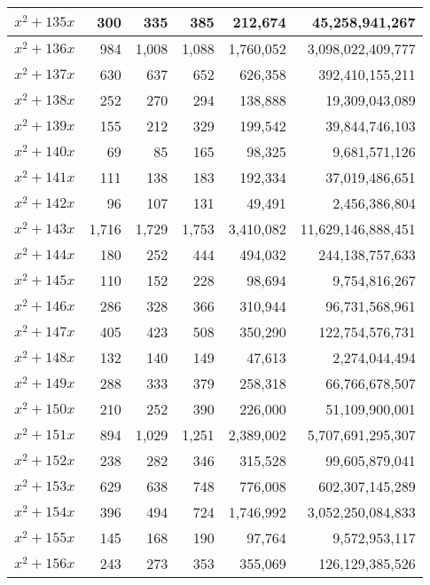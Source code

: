 \documentclass[a4paper]{amsproc}
\theoremstyle{plain}
\begin{document}
\begin{longtable}{ | l | r | r | r | r | r | }
$x^2 + 135x$ & 300 & 335 & 385 & 212{,}674 & 45{,}258{,}941{,}267 \\ \hline
$x^2 + 136x$ & 984 & 1{,}008 & 1{,}088 & 1{,}760{,}052 & 3{,}098{,}022{,}409{,}777 \\ \hline
$x^2 + 137x$ & 630 & 637 & 652 & 626{,}358 & 392{,}410{,}155{,}211 \\ \hline
$x^2 + 138x$ & 252 & 270 & 294 & 138{,}888 & 19{,}309{,}043{,}089 \\ \hline
$x^2 + 139x$ & 155 & 212 & 329 & 199{,}542 & 39{,}844{,}746{,}103 \\ \hline
$x^2 + 140x$ & 69 & 85 & 165 & 98{,}325 & 9{,}681{,}571{,}126 \\ \hline
$x^2 + 141x$ & 111 & 138 & 183 & 192{,}334 & 37{,}019{,}486{,}651 \\ \hline
$x^2 + 142x$ & 96 & 107 & 131 & 49{,}491 & 2{,}456{,}386{,}804 \\ \hline
$x^2 + 143x$ & 1{,}716 & 1{,}729 & 1{,}753 & 3{,}410{,}082 & 11{,}629{,}146{,}888{,}451 \\ \hline
$x^2 + 144x$ & 180 & 252 & 444 & 494{,}032 & 244{,}138{,}757{,}633 \\ \hline
$x^2 + 145x$ & 110 & 152 & 228 & 98{,}694 & 9{,}754{,}816{,}267 \\ \hline
$x^2 + 146x$ & 286 & 328 & 366 & 310{,}944 & 96{,}731{,}568{,}961 \\ \hline
$x^2 + 147x$ & 405 & 423 & 508 & 350{,}290 & 122{,}754{,}576{,}731 \\ \hline
$x^2 + 148x$ & 132 & 140 & 149 & 47{,}613 & 2{,}274{,}044{,}494 \\ \hline
$x^2 + 149x$ & 288 & 333 & 379 & 258{,}318 & 66{,}766{,}678{,}507 \\ \hline
$x^2 + 150x$ & 210 & 252 & 390 & 226{,}000 & 51{,}109{,}900{,}001 \\ \hline
$x^2 + 151x$ & 894 & 1{,}029 & 1{,}251 & 2{,}389{,}002 & 5{,}707{,}691{,}295{,}307 \\ \hline
$x^2 + 152x$ & 238 & 282 & 346 & 315{,}528 & 99{,}605{,}879{,}041 \\ \hline
$x^2 + 153x$ & 629 & 638 & 748 & 776{,}008 & 602{,}307{,}145{,}289 \\ \hline
$x^2 + 154x$ & 396 & 494 & 724 & 1{,}746{,}992 & 3{,}052{,}250{,}084{,}833 \\ \hline
$x^2 + 155x$ & 145 & 168 & 190 & 97{,}764 & 9{,}572{,}953{,}117 \\ \hline
$x^2 + 156x$ & 243 & 273 & 353 & 355{,}069 & 126{,}129{,}385{,}526 \\ \hline

\end{longtable}
\end{document}
